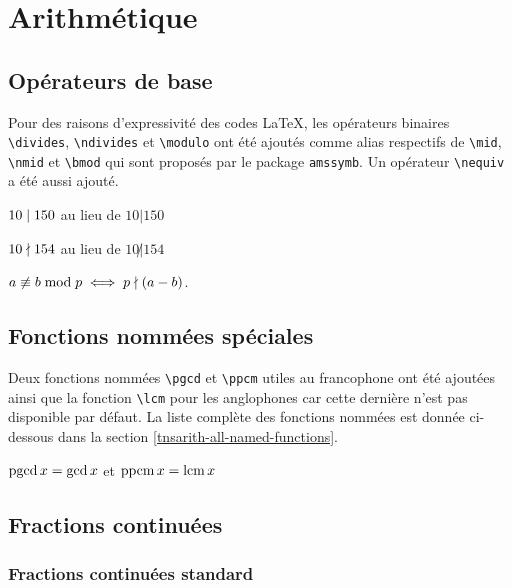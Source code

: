 \documentclass[12pt,a4paper]{book}
\makeatletter
\newcommand\env[1]{\texttt{#1}}
\newcommand\macro[1]{\env{\textbackslash{}#1}}
\theoremstyle{definition}
\newcounter{paraexample}[subsubsection]
\newcommand\@newexample@abstract[2]{%
	\paragraph{%
		#1%
		\if\relax\detokenize{#2}\relax\else {} -- #2\fi%
	}%
}
\newcommand\newparaexample{\@ifstar{\@newparaexample@star}{\@newparaexample@no@star}}
\newcommand\@newparaexample@no@star[1]{%
	\refstepcounter{paraexample}%
	\@newexample@abstract{Exemple \theparaexample}{#1}%
}
\newcommand\@newparaexample@star[1]{%
	\@newexample@abstract{Exemple}{#1}%
}
\makeatother
\begin{document}
{{%
\chapter{Arithmétique}

\section{Opérateurs de base}

Pour des raisons d'expressivité des codes \LaTeX{}, les opérateurs binaires \macro{divides}, \macro{ndivides} et \macro{modulo} ont été ajoutés comme alias respectifs de \macro{mid}, \macro{nmid} et \macro{bmod} qui sont proposés par le package \verb+amssymb+. Un opérateur \macro{nequiv} a été aussi ajouté.

\begin{latexex}
$10 \mid 150$ au lieu de
$10 | 150$

$10 \nmid 154$ au lieu de
$10 \not| 154$

$a \nequiv b \modulo p
 \iff
 p \ndivides (a - b)$.
\end{latexex}


\section{Fonctions nommées spéciales}


Deux fonctions nommées \macro{pgcd} et \macro{ppcm} utiles au francophone ont été ajoutées ainsi que la fonction \macro{lcm} pour les anglophones car cette dernière n'est pas disponible par défaut.
La liste complète des fonctions nommées est donnée ci-dessous dans la section \ref{tnsarith-all-named-functions}.

\begin{latexex}
$\operatorname{\operatorname{pgcd}} x = \gcd x$ et $\operatorname{\operatorname{ppcm}} x = \operatorname{\operatorname{lcm}} x$
\end{latexex}


\section{Fractions continuées}

\subsection{Fractions continuées standard}


}}
\end{document}

